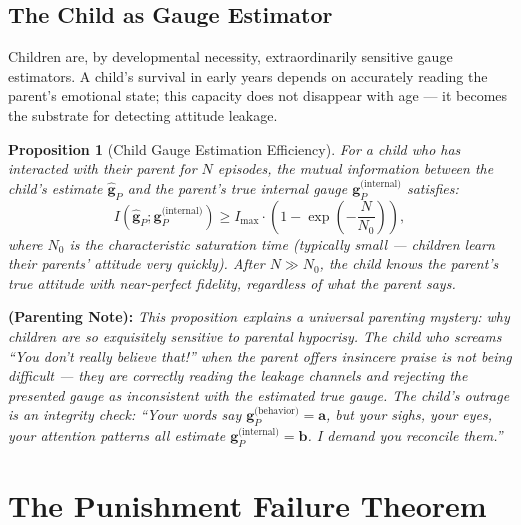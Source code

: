 \documentclass[11pt,a4paper]{article}
\newtheorem{proposition}[theorem]{Proposition}
\newcommand{\parentnote}[1]{%
  \medskip\noindent
  \textbf{ (Parenting Note):} \textit{#1}%
}
\begin{document}
\subsection{The Child as Gauge Estimator}

Children are, by developmental necessity, extraordinarily sensitive gauge estimators. A child's survival in early years depends on accurately reading the parent's emotional state; this capacity does not disappear with age — it becomes the substrate for detecting attitude leakage.

\begin{proposition}[Child Gauge Estimation Efficiency]
\label{prop:child_estimator}
For a child who has interacted with their parent for $N$ episodes, the mutual information between the child's estimate $\hat{\mathbf{g}}_P$ and the parent's true internal gauge $\mathbf{g}_P^{\text{(internal)}}$ satisfies:
\begin{equation}
    I(\hat{\mathbf{g}}_P; \mathbf{g}_P^{\text{(internal)}}) \geq I_{\text{max}} \cdot \left(1 - \exp\left(-\frac{N}{N_0}\right)\right),
\end{equation}
where $N_0$ is the characteristic saturation time (typically small — children learn their parents' attitude very quickly). After $N \gg N_0$, the child knows the parent's true attitude with near-perfect fidelity, regardless of what the parent \textit{says}.
\end{proposition}

\parentnote{This proposition explains a universal parenting mystery: why children are so exquisitely sensitive to parental hypocrisy. The child who screams ``You don't really believe that!'' when the parent offers insincere praise is not being difficult — they are correctly reading the leakage channels and rejecting the presented gauge as inconsistent with the estimated true gauge. The child's outrage is an integrity check: ``Your words say $\mathbf{g}_P^{\text{(behavior)}} = \mathbf{a}$, but your sighs, your eyes, your attention patterns all estimate $\mathbf{g}_P^{\text{(internal)}} = \mathbf{b}$. I demand you reconcile them.''}

\section{The Punishment Failure Theorem}
\label{sec:punishment}
\end{document}
